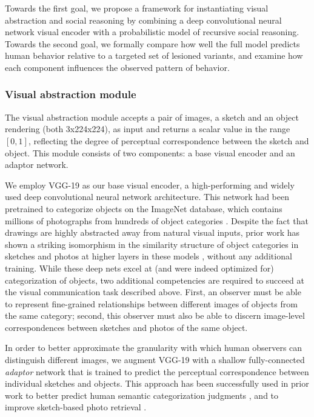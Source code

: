 \documentclass[9pt,twocolumn,twoside]{pnas-new}
\begin{document}
{Towards the first goal, we propose a framework for instantiating visual abstraction and social reasoning by combining a deep convolutional neural network visual encoder with a probabilistic model of recursive social reasoning. Towards the second goal, we formally compare how well the full model predicts human behavior relative to a targeted set of lesioned variants, and examine how each component influences the observed pattern of behavior.  

\subsubsection*{Visual abstraction module}

The visual abstraction module accepts a pair of images, a sketch and an object rendering (both 3x224x224), as input and returns a scalar value in the range $[0,1]$, reflecting the degree of perceptual correspondence between the sketch and object. This module consists of two components: a base visual encoder and an adaptor network. 

We employ VGG-19 \cite{simonyan2014very} as our base visual encoder, a high-performing and widely used deep convolutional neural network architecture. This network had been pretrained to categorize objects on the ImageNet database, which contains millions of photographs from hundreds of object categories \cite{deng2009imagenet}. Despite the fact that drawings are highly abstracted away from natural visual inputs, prior work has shown a striking isomorphism in the similarity structure \cite{kriegeskorte2008matching} of object categories in sketches and photos at higher layers in these models \cite{FanCommon2018}, without any additional training. While these deep nets excel at (and were indeed optimized for) categorization of objects, two additional competencies are required to succeed at the visual communication task described above. First, an observer must be able to represent fine-grained relationships between different images of objects from the same category; second, this observer must also be able to discern image-level correspondences between sketches and photos of the same object. 

In order to better approximate the granularity with which human observers can distinguish different images, we augment VGG-19 with a shallow fully-connected \textit{adaptor} network that is trained to predict the perceptual correspondence between individual sketches and objects. This approach has been successfully used in prior work to better predict human semantic categorization judgments \cite[]{peterson2016adapting}, and to improve sketch-based photo retrieval \cite[]{sangkloy2016sketchy}.

}
\end{document}
